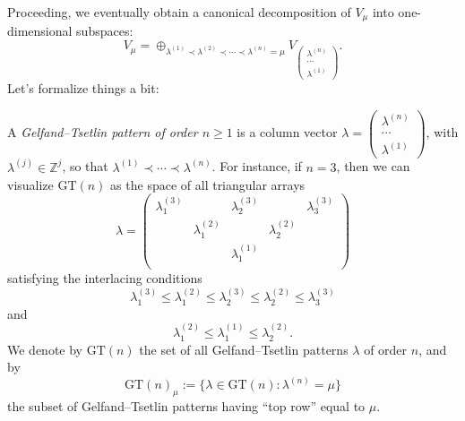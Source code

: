\documentclass[reqno]{amsart} 
\begin{document}
Proceeding, we eventually obtain a canonical decomposition of $V_\mu$ into one-dimensional subspaces:
\begin{equation*}
  V_\mu
  =
  \oplus_{\lambda^{(1)} \prec
    \lambda^{(2)} \prec \dotsb \prec \lambda^{(n)} = \mu }
  V _{
    \begin{pmatrix}
      \lambda^{(n)}  \\
      \dotsb \\
      \lambda^{(1)}
    \end{pmatrix}
  }.
\end{equation*}
Let's formalize things a bit:
\begin{definition}
  A \emph{Gelfand--Tsetlin pattern of order $n \geq 1$} is a column vector $\lambda = 
\begin{pmatrix}
    \lambda^{(n)}  \\
    \dotsb   \\
    \lambda^{(1)}
  \end{pmatrix}
  $, with $\lambda^{(j)} \in \mathbb{Z}^j$, so that $\lambda^{(1)} \prec \dotsb \prec \lambda^{(n)}$.  For instance, if $n = 3$, then we can visualize $\mathrm{GT}(n)$ as the space of all triangular arrays
  \begin{equation*}
    \lambda =
    \begin{pmatrix}
      \lambda^{(3)}_1 &  & \lambda^{(3)}_2 & & \lambda^{(3)}_3 \\
                      & \lambda^{(2)}_1 &  & \lambda^{(2)}_2 &  \\
                      &  & \lambda^{(1)}_1 &  &  \\
    \end{pmatrix}
  \end{equation*}
  satisfying the interlacing conditions
  \begin{equation}
    \lambda^{(3)}_1 \leq \lambda^{(2)}_1 \leq \lambda^{(3)}_2
    \leq \lambda^{(2)}_2
    \leq \lambda^{(3)}_3
  \end{equation}
  and
  \begin{equation}
    \lambda^{(2)}_1 \leq \lambda^{(1)}_1 \leq \lambda^{(2)}_2.
  \end{equation}
  We denote by $\mathrm{GT}(n)$ the set of all Gelfand--Tsetlin patterns $\lambda$ of order $n$, and by
  \begin{equation*}
    \mathrm{GT}(n)_{\mu} := \{\lambda \in \mathrm{GT}(n) : \lambda^{(n)}
    = \mu \}
  \end{equation*}
  the subset of Gelfand--Tsetlin patterns having ``top row'' equal to $\mu$.
\end{definition}
\end{document}
